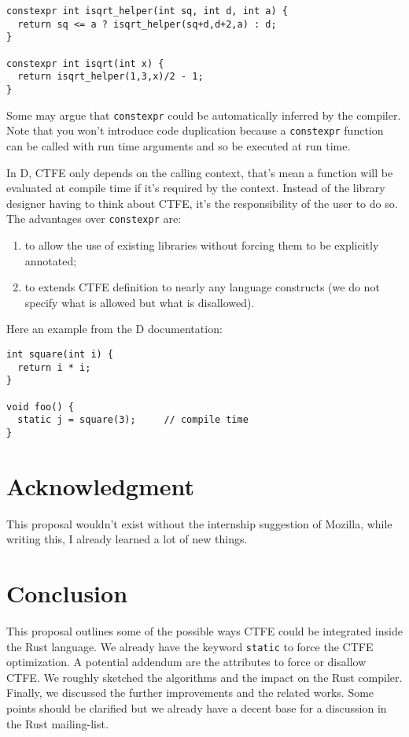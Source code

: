 \documentclass[a4paper,11pt]{article}
\begin{document}
\begin{lstlisting}
constexpr int isqrt_helper(int sq, int d, int a) {
  return sq <= a ? isqrt_helper(sq+d,d+2,a) : d;
}

constexpr int isqrt(int x) {
  return isqrt_helper(1,3,x)/2 - 1;
}
\end{lstlisting}

Some may argue that \lstinline{constexpr} could be automatically inferred by the compiler. Note that you won't introduce code duplication because a \lstinline{constexpr} function can be called with run time arguments and so be executed at run time.
\newline

In D, CTFE only depends on the calling context, that's mean a function will be evaluated at compile time if it's required by the context. Instead of the library designer having to think about CTFE, it's the responsibility of the user to do so. The advantages over \lstinline{constexpr} are:

\begin{enumerate}
\item to allow the use of existing libraries without forcing them to be explicitly annotated;
\item to extends CTFE definition to nearly any language constructs (we do not specify what is allowed but what is disallowed).
\end{enumerate}

Here an example from the D documentation\cite{D_CTFE}:

\begin{lstlisting}
int square(int i) {
  return i * i;
}

void foo() {
  static j = square(3);     // compile time
}
\end{lstlisting}

\section{Acknowledgment}

This proposal wouldn't exist without the internship suggestion of Mozilla, while writing this, I already learned a lot of new things.

\section{Conclusion}

This proposal outlines some of the possible ways CTFE could be integrated inside the Rust language. We already have the keyword \lstinline{static} to force the CTFE optimization. A potential addendum are the attributes to force or disallow CTFE. We roughly sketched the algorithms and the impact on the Rust compiler. Finally, we discussed the further improvements and the related works. Some points should be clarified but we already have a decent base for a discussion in the Rust mailing-list.

\newpage
{}

\end{document}
